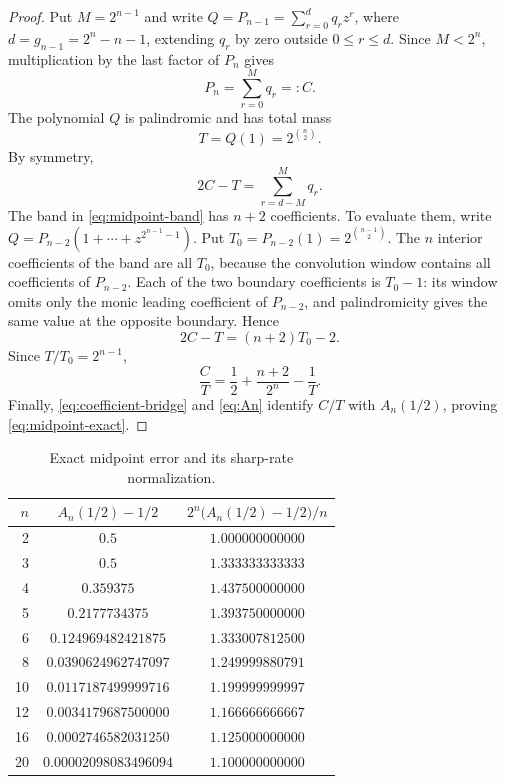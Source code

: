 \documentclass[11pt,oneside]{article}
\theoremstyle{definition}
\theoremstyle{remark}
\begin{document}
\begin{proof}
Put $M=2^{n-1}$ and write $Q=P_{n-1}=\sum_{r=0}^{d}q_rz^r$, where
$d=g_{n-1}=2^n-n-1$, extending $q_r$ by zero outside $0\le r\le d$.  Since $M<2^n$,
multiplication by the last factor of $P_n$ gives
\begin{equation}
 [z^M]P_n=\sum_{r=0}^{M}q_r=:C.                            \label{eq:midpoint-C}
\end{equation}
The polynomial $Q$ is palindromic and has total mass
\begin{equation}
 T=Q(1)=2^{\binom n2}.                                     \label{eq:midpoint-T}
\end{equation}
By symmetry,
\begin{equation}
 2C-T=\sum_{r=d-M}^{M}q_r.                                 \label{eq:midpoint-band}
\end{equation}
The band in \eqref{eq:midpoint-band} has $n+2$ coefficients.  To evaluate them, write
$Q=P_{n-2}(1+\cdots+z^{2^{n-1}-1})$.  Put
$T_0=P_{n-2}(1)=2^{\binom{n-1}{2}}$.  The $n$ interior coefficients of the band are all
$T_0$, because the convolution window contains all coefficients of $P_{n-2}$.  Each of the
two boundary coefficients is $T_0-1$: its window omits only the monic leading coefficient of
$P_{n-2}$, and palindromicity gives the same value at the opposite boundary.  Hence
\begin{equation}
 2C-T=(n+2)T_0-2.                                         \label{eq:midpoint-band-value}
\end{equation}
Since $T/T_0=2^{n-1}$,
\[
 \frac CT=\frac12+\frac{n+2}{2^n}-\frac1T.
\]
Finally, \eqref{eq:coefficient-bridge} and \eqref{eq:An} identify $C/T$ with
$A_n(1/2)$, proving \eqref{eq:midpoint-exact}.
\end{proof}

\begin{table}[htbp]
\centering
\caption{Exact midpoint error and its sharp-rate normalization.}
\label{tab:midpoint}
\begin{tabular}{@{}rcc@{}}
\toprule
$n$ & $A_n(1/2)-1/2$ & $2^n\bigl(A_n(1/2)-1/2\bigr)/n$\\
\midrule
2  & $0.5$                 & $1.000000000000$\\
3  & $0.5$                 & $1.333333333333$\\
4  & $0.359375$            & $1.437500000000$\\
5  & $0.2177734375$        & $1.393750000000$\\
6  & $0.124969482421875$   & $1.333007812500$\\
8  & $0.0390624962747097$  & $1.249999880791$\\
10 & $0.0117187499999716$  & $1.199999999997$\\
12 & $0.0034179687500000$  & $1.166666666667$\\
16 & $0.0002746582031250$  & $1.125000000000$\\
20 & $0.00002098083496094$ & $1.100000000000$\\
\bottomrule
\end{tabular}
\end{table}
\end{document}
